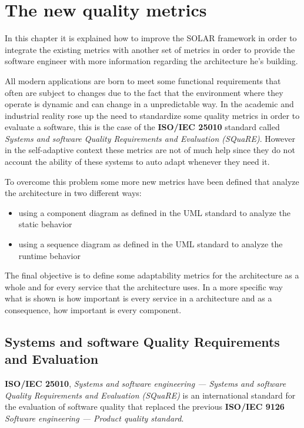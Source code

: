 \chapter{The new quality metrics}
\label{cap:quality-metrics}
In this chapter it is explained how to improve the SOLAR framework in order to integrate the existing metrics with another set of metrics in order to provide the software engineer with more information regarding the architecture he's building. 

All modern applications are born to meet some functional requirements that often are subject to changes due to the fact that the environment where they operate is dynamic and can change in a unpredictable way. In the academic and industrial reality rose up the need to standardize some quality metrics in order to evaluate a software, this is the case of the \textbf{ISO/IEC 25010} standard called \emph{Systems and software Quality Requirements and Evaluation (SQuaRE)}\cite{iso/iec-25010}. However in the self-adaptive context these metrics are not of much help since they do not account the ability of these systems to auto adapt whenever they need it.

To overcome this problem some more new metrics have been defined that analyze the architecture in two different ways:
\begin{itemize}
	\item using a component diagram as defined in the UML standard\cite{uml} to analyze the static behavior
	\item using a sequence diagram as defined in the UML standard\cite{uml} to analyze the runtime behavior
\end{itemize}

The final objective is to define some adaptability metrics for the architecture as a whole and for every service that the architecture uses. In a more specific way what is shown is how important is every service in a architecture and as a consequence, how important is every component.

\section{Systems and software Quality Requirements and Evaluation}
\label{sec:square}
\textbf{ISO/IEC 25010}, \emph{Systems and software engineering — Systems and software Quality Requirements and Evaluation (SQuaRE)}\cite{iso/iec-25010} is an international standard for the evaluation of software quality that replaced the previous \textbf{ISO/IEC 9126} \emph{Software engineering — Product quality standard}\cite{iso/iec-9126}.

